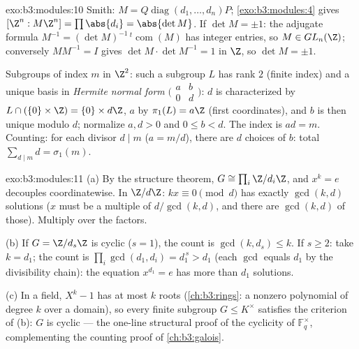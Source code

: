 \begin{solution}{exo:b3:modules:10}
Smith: $M = Q\operatorname{diag}(d_1,\dots,d_n)P$;
\cref{exo:b3:modules:4} gives $[\Z^n : M\Z^n] = \prod\abs{d_i} =
\abs{\det M}$. If $\det M = \pm 1$: the adjugate formula
$M^{-1} = (\det M)^{-1}\,{}^{t}\!\operatorname{com}(M)$ has
integer entries, so $M \in GL_n(\Z)$; conversely $MM^{-1} = I$
gives $\det M \cdot \det M^{-1} = 1$ in $\Z$, so $\det M = \pm1$.

Subgroups of index $m$ in $\Z^2$: such a subgroup $L$ has rank
$2$ (finite index) and a unique basis in \emph{Hermite normal
form} $\bigl(\begin{smallmatrix} a & b\\ 0 &
d\end{smallmatrix}\bigr)$: $d$ is characterized by $L \cap (\{0\}
\times \Z) = \{0\} \times d\Z$, $a$ by $\pi_1(L) = a\Z$ (first
coordinates), and $b$ is then unique modulo $d$; normalize $a, d
> 0$ and $0 \leq b < d$. The index is $ad = m$. Counting: for
each divisor $d \mid m$ ($a = m/d$), there are $d$ choices of
$b$: total $\sum_{d \mid m} d = \sigma_1(m)$.
\end{solution}

\begin{solution}{exo:b3:modules:11}
(a) By the structure theorem, $G \cong \prod_i\Z/d_i\Z$, and
$x^k = e$ decouples coordinatewise. In $\Z/d\Z$: $kx \equiv 0
\pmod d$ has exactly $\gcd(k, d)$ solutions ($x$ must be a
multiple of $d/\gcd(k,d)$, and there are $\gcd(k, d)$ of
those). Multiply over the factors.

(b) If $G = \Z/d_s\Z$ is cyclic ($s = 1$), the count is
$\gcd(k, d_s) \leq k$. If $s \geq 2$: take $k = d_1$; the
count is $\prod_i\gcd(d_1, d_i) = d_1^{\,s} > d_1$ (each
$\gcd$ equals $d_1$ by the divisibility chain): the equation
$x^{d_1} = e$ has more than $d_1$ solutions.

(c) In a field, $X^k - 1$ has at most $k$ roots
(\cref{ch:b3:rings}: a nonzero polynomial of degree $k$ over
a domain), so every finite subgroup $G \leq K^\times$
satisfies the criterion of (b): $G$ is cyclic --- the
one-line structural proof of the cyclicity of
$\mathbb F_q^\times$, complementing the counting proof of
\cref{ch:b3:galois}.
\end{solution}

